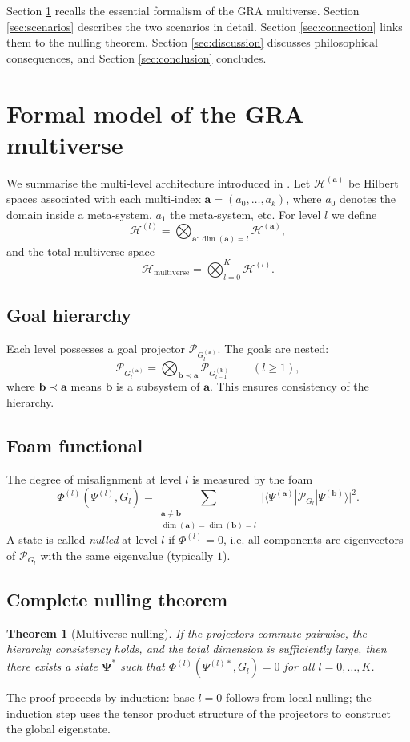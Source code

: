 \documentclass[12pt,a4paper]{article}
\newtheorem{theorem}{Theorem}
\theoremstyle{definition}
\begin{document}
Section \ref{sec:formal} recalls the essential formalism of the GRA multiverse. Section \ref{sec:scenarios} describes the two scenarios in detail. Section \ref{sec:connection} links them to the nulling theorem. Section \ref{sec:discussion} discusses philosophical consequences, and Section \ref{sec:conclusion} concludes.

\section{Formal model of the GRA multiverse}
\label{sec:formal}

We summarise the multi‑level architecture introduced in \cite{gra}. Let $\mathcal{H}^{(\mathbf{a})}$ be Hilbert spaces associated with each multi‑index $\mathbf{a}=(a_0,\dots,a_k)$, where $a_0$ denotes the domain inside a meta‑system, $a_1$ the meta‑system, etc. For level $l$ we define
\[
\mathcal{H}^{(l)} = \bigotimes_{\mathbf{a}:\dim(\mathbf{a})=l} \mathcal{H}^{(\mathbf{a})},
\]
and the total multiverse space
\[
\mathcal{H}_{\text{multiverse}} = \bigotimes_{l=0}^K \mathcal{H}^{(l)}.
\]

\subsection{Goal hierarchy}
Each level possesses a goal projector $\mathcal{P}_{G_l^{(\mathbf{a})}}$. The goals are nested:
\[
\mathcal{P}_{G_l^{(\mathbf{a})}} = \bigotimes_{\mathbf{b}\prec\mathbf{a}} \mathcal{P}_{G_{l-1}^{(\mathbf{b})}}\qquad (l\ge 1),
\]
where $\mathbf{b}\prec\mathbf{a}$ means $\mathbf{b}$ is a subsystem of $\mathbf{a}$. This ensures consistency of the hierarchy.

\subsection{Foam functional}
The degree of misalignment at level $l$ is measured by the foam
\[
\Phi^{(l)}(\Psi^{(l)},G_l)=\sum_{\substack{\mathbf{a}\neq\mathbf{b}\\\dim(\mathbf{a})=\dim(\mathbf{b})=l}} \bigl|\langle\Psi^{(\mathbf{a})}|\mathcal{P}_{G_l}|\Psi^{(\mathbf{b})}\rangle\bigr|^2.
\]
A state is called \emph{nulled} at level $l$ if $\Phi^{(l)}=0$, i.e. all components are eigenvectors of $\mathcal{P}_{G_l}$ with the same eigenvalue (typically $1$).

\subsection{Complete nulling theorem}
\begin{theorem}[Multiverse nulling]
If the projectors commute pairwise, the hierarchy consistency holds, and the total dimension is sufficiently large, then there exists a state $\mathbf{\Psi}^*$ such that $\Phi^{(l)}(\Psi^{(l)*},G_l)=0$ for all $l=0,\dots,K$.
\end{theorem}
The proof proceeds by induction: base $l=0$ follows from local nulling; the induction step uses the tensor product structure of the projectors to construct the global eigenstate.
\end{document}
